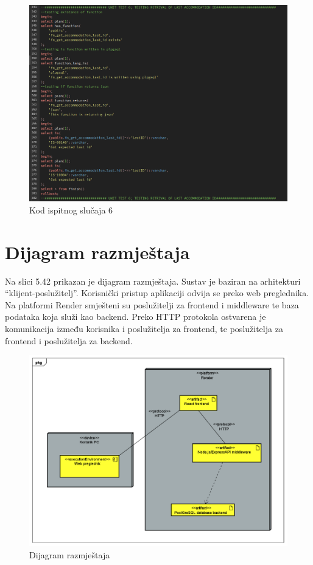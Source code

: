 				\begin{figure}[H]
					\centering
					\includegraphics[width=\textwidth]{slike/unit_tests/ut_6/code.png}
					\caption{Kod ispitnog slučaja 6}
					\label{fig: IS6-kod}
				\end{figure}
				\eject
			\eject
		\section{Dijagram razmještaja}
			
			Na slici 5.42 prikazan je dijagram razmještaja. Sustav je baziran na arhitekturi “klijent-poslužitelj”. Korisnički pristup aplikaciji odvija se preko web preglednika. Na platformi Render smješteni su poslužitelji za frontend i middleware te baza podataka koja služi kao backend. Preko HTTP protokola ostvarena je komunikacija između korisnika i poslužitelja za frontend, te poslužitelja za frontend i poslužitelja za backend.
			
			\begin{figure}[H]
				\centering
				\includegraphics[width=\textwidth]{slike/UML_Deployment.png} %
				\caption{Dijagram razmještaja}
				\label{fig:dijagram razmještaja}
			\end{figure}
			
